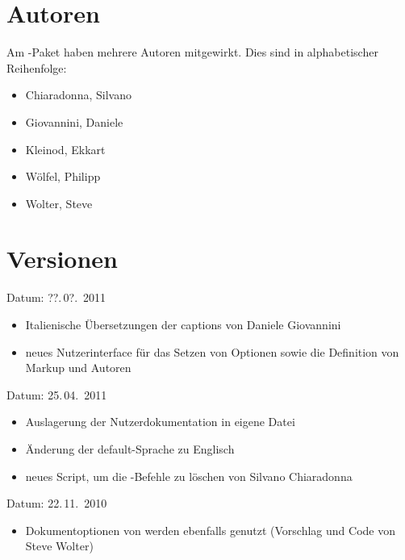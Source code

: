 \section{Autoren}
\label{sec:authors}

Am -Paket haben mehrere Autoren mitgewirkt.
Dies sind in alphabetischer Reihenfolge:
\begin{itemize}
	\item Chiaradonna, Silvano
	\item Giovannini, Daniele
	\item Kleinod, Ekkart
	\item Wölfel, Philipp
	\item Wolter, Steve
\end{itemize}



\section{Versionen}
\label{sec:versions}


Datum: ??.\,0?.~2011
\begin{itemize}
	\item Italienische Übersetzungen der captions von Daniele Giovannini
	\item neues Nutzerinterface für das Setzen von Optionen sowie die Definition von Markup und Autoren
\end{itemize}


Datum: 25.\,04.~2011
\begin{itemize}
	\item Auslagerung der Nutzerdokumentation in eigene Datei
	\item Änderung der default-Sprache zu Englisch
	\item neues Script, um die -Befehle zu löschen von Silvano Chiaradonna
\end{itemize}


Datum: 22.\,11.~2010
\begin{itemize}
\item Dokumentoptionen von  werden ebenfalls genutzt (Vorschlag und Code von Steve Wolter)
\end{itemize}


